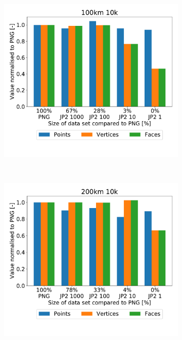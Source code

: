 \begin{figure}[htb]
\begin{subfigure}[b]{0.49\textwidth}
            \includegraphics[width=\textwidth]{doc/thesis/0_figures/recon/100km_10k}
            \caption{}
            \label{fig:recon_120_100_10}
        \end{subfigure}
        \\
        \begin{subfigure}[b]{0.49\textwidth}
            \centering
            \includegraphics[width=\textwidth]{doc/thesis/0_figures/recon/200km_10k}

\end{subfigure}
\end{figure}
